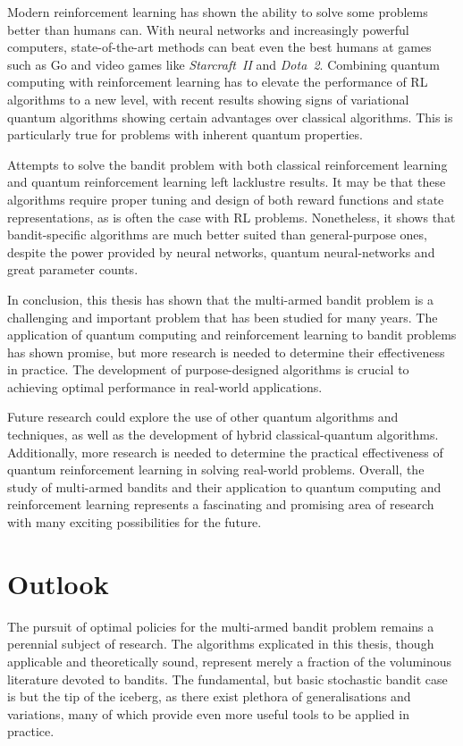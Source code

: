 Modern reinforcement learning has shown the ability to solve some problems better than humans can.
With neural networks and increasingly powerful computers, state-of-the-art methods can beat even the best humans at games such as Go and video games like \textit{Starcraft~II} and \textit{Dota~2}.
Combining quantum computing with reinforcement learning has to elevate the performance of RL algorithms to a new level, with recent results showing signs of variational quantum algorithms showing certain advantages over classical algorithms.
This is particularly true for problems with inherent quantum properties.

Attempts to solve the bandit problem with both classical reinforcement learning and quantum reinforcement learning left lacklustre results.
It may be that these algorithms require proper tuning and design of both reward functions and state representations, as is often the case with RL problems.
Nonetheless, it shows that bandit-specific algorithms are much better suited than general-purpose ones, despite the power provided by neural networks, quantum neural-networks and great parameter counts.

In conclusion, this thesis has shown that the multi-armed bandit problem is a challenging and important problem that has been studied for many years. The application of quantum computing and reinforcement learning to bandit problems has shown promise, but more research is needed to determine their effectiveness in practice. The development of purpose-designed algorithms is crucial to achieving optimal performance in real-world applications.

Future research could explore the use of other quantum algorithms and techniques, as well as the development of hybrid classical-quantum algorithms. Additionally, more research is needed to determine the practical effectiveness of quantum reinforcement learning in solving real-world problems. Overall, the study of multi-armed bandits and their application to quantum computing and reinforcement learning represents a fascinating and promising area of research with many exciting possibilities for the future.

\section{Outlook}
The pursuit of optimal policies for the multi-armed bandit problem remains a perennial subject of research.
The algorithms explicated in this thesis, though applicable and theoretically sound, represent merely a fraction of the voluminous literature devoted to bandits.
The fundamental, but basic stochastic bandit case is but the tip of the iceberg, as there exist plethora of generalisations and variations, many of which provide even more useful tools to be applied in practice.

